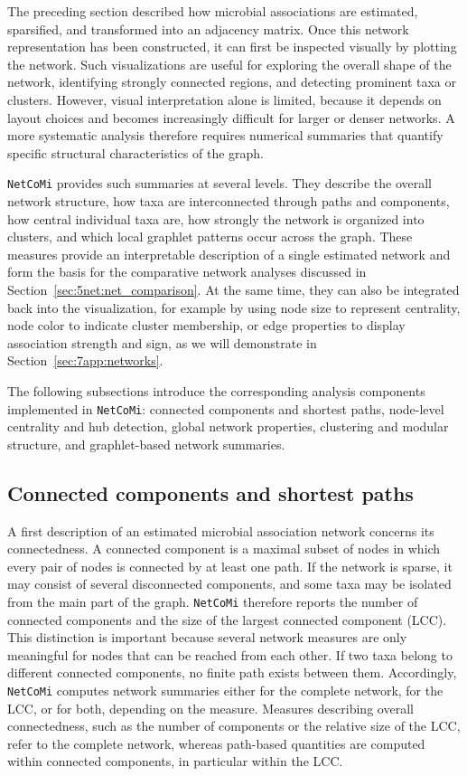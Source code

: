 The preceding section described how microbial associations are estimated, sparsified, and transformed into an adjacency matrix. Once this network representation has been constructed, it can first be inspected visually by plotting the network. Such visualizations are useful for exploring the overall shape of the network, identifying strongly connected regions, and detecting prominent taxa or clusters. However, visual interpretation alone is limited, because it depends on layout choices and becomes increasingly difficult for larger or denser networks. A more systematic analysis therefore requires numerical summaries that quantify specific structural characteristics of the graph.

\texttt{NetCoMi} provides such summaries at several levels. They describe the overall network structure, how taxa are interconnected through paths and components, how central individual taxa are, how strongly the network is organized into clusters, and which local graphlet patterns occur across the graph. These measures provide an interpretable description of a single estimated network and form the basis for the comparative network analyses discussed in Section~\ref{sec:5net:net_comparison}. At the same time, they can also be integrated back into the visualization, for example by using node size to represent centrality, node color to indicate cluster membership, or edge properties to display association strength and sign, as we will demonstrate in Section~\ref{sec:7app:networks}.

The following subsections introduce the corresponding analysis components implemented in \texttt{NetCoMi}: connected components and shortest paths, node-level centrality and hub detection, global network properties, clustering and modular structure, and graphlet-based network summaries.

\subsection{Connected components and shortest paths}
\label{sec:5net:net_analysis:components}

A first description of an estimated microbial association network concerns its connectedness. A connected component is a maximal subset of nodes in which every pair of nodes is connected by at least one path. If the network is sparse, it may consist of several disconnected components, and some taxa may be isolated from the main part of the graph. \texttt{NetCoMi} therefore reports the number of connected components and the size of the largest connected component (LCC). This distinction is important because several network measures are only meaningful for nodes that can be reached from each other. If two taxa belong to different connected components, no finite path exists between them. Accordingly, \texttt{NetCoMi} computes network summaries either for the complete network, for the LCC, or for both, depending on the measure. Measures describing overall connectedness, such as the number of components or the relative size of the LCC, refer to the complete network, whereas path-based quantities are computed within connected components, in particular within the LCC.

